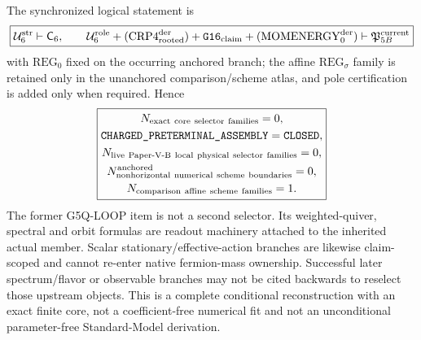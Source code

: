 \documentclass[12pt,a4paper]{article}
\newcommand{\CoreSix}{\mathsf C_6}
\newcommand{\Ubase}{\mathcal U_6^{\rm str}}
\newcommand{\Urole}{\mathcal U_6^{\rm role}}
\begin{document}
The synchronized logical statement is
\[
\boxed{
\Ubase\vdash\CoreSix,
\qquad
\Urole+(\mathrm{CRP4}_{\rm rooted}^{\rm der})+
\texttt{G16}_{\rm claim}
+(\mathrm{MOMENERGY}_{0}^{\rm der})
\vdash\mathfrak P_{5B}^{\rm current}
}
\]
with \(\mathrm{REG}_{0}\) fixed on the occurring anchored branch; the affine
\(\mathrm{REG}_{\sigma}\) family is retained only in the unanchored
comparison/scheme atlas, and pole certification is added only when required.  Hence
\[
\boxed{\begin{gathered}
N_{\rm exact\ core\ selector\ families}=0,\\
\texttt{CHARGED\_PRETERMINAL\_ASSEMBLY}=\texttt{CLOSED},\\
N_{\rm live\ Paper\text{-}V\text{-}B\ local\ physical\ selector\ families}=0,\\
N_{\rm nonhorizontal\ numerical\ scheme\ boundaries}^{\rm anchored}=0,\\
N_{\rm comparison\ affine\ scheme\ families}=1.
\end{gathered}}
\]
The former G5Q-LOOP item is not a second selector.  Its weighted-quiver,
spectral and orbit formulas are readout machinery attached to the inherited
actual member.  Scalar stationary/effective-action branches are likewise
claim-scoped and cannot re-enter native fermion-mass ownership.  Successful later spectrum/flavor or
observable branches may not be cited backwards to reselect those upstream
objects.  This is a complete conditional reconstruction with an exact finite
core, not a coefficient-free numerical fit and not an unconditional
parameter-free Standard-Model derivation.


\end{document}
